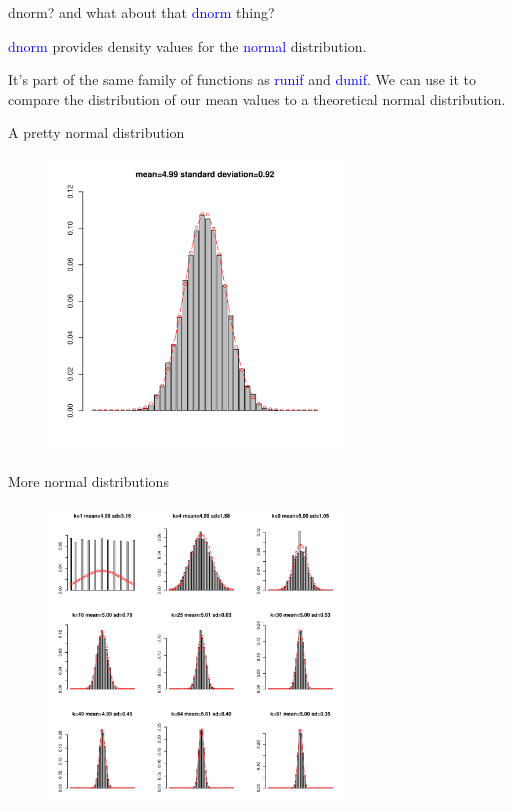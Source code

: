 \documentclass[pdf]{beamer}
\begin{document}
\begin{frame}{dnorm?}
  and what about that \textcolor{blue}{dnorm} thing?

  \textcolor{blue}{dnorm} provides density values for the
  \textcolor{blue}{normal} distribution. 

  It's part of the same family of functions as \textcolor{blue}{runif}
  and \textcolor{blue}{dunif}. We can use it to compare the distribution
  of our mean values to a theoretical normal distribution.
\end{frame}

\begin{frame}{A pretty normal distribution}
  \begin{figure}[ht]
    \includegraphics[width=0.7\textwidth]{images/dist2}
  \end{figure}
\end{frame}

\begin{frame}{More normal distributions}
  \begin{figure}[ht]
    \includegraphics[width=0.7\textwidth]{images/dist3}
  \end{figure}

\end{frame}
\end{document}
